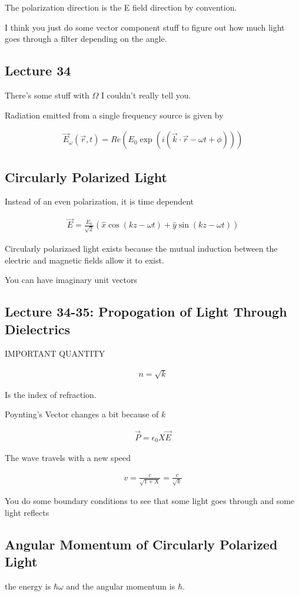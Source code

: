 \documentclass[fleqn]{report}
\newcommand{\equations} [1] {
\begin{gather*}
#1
\end{gather*}
}
\begin{document}
The polarization direction is the E field direction by convention. 

I think you just do some vector component stuff to figure out how much light 
goes through a filter depending on the angle. 

\subsection{Lecture 34}
There's some stuff with $\Omega$ I couldn't really tell you. 

Radiation emitted from a single frequency source is given by 

\equations{
    \vec E_{\omega}(\vec r, t)
    =
    Re 
    \left(
        E_0
        \exp(i (\vec k \cdot \vec r - \omega t + \phi ))
    \right)
}

\subsection{Circularly Polarized Light}
Instead of an even polarization, it is time dependent 
\equations{
    \vec E 
    =
    \frac{E_0}{\sqrt{2}}
    \left(
        \hat x 
        \cos(kz - \omega t)
        +
        \hat y
        \sin(kz - \omega t)
    \right)
}

Circularly polarizaed light exists because the mutual induction between 
the electric and magnetic fields allow it to exist. 

You can have imaginary unit vectors 

\subsection{Lecture 34-35: Propogation of Light Through Dielectrics}

IMPORTANT QUANTITY
\equations{
    n = \sqrt{k}
}
Is the index of refraction.

Poynting's Vector changes a bit because of $k$

\equations{
    \vec P = \epsilon_0 X \vec E 
}

The wave travels with a new speed 
\equations{
    v = \frac{c}{\sqrt{1 + X}} = \frac{c}{\sqrt{k}} 
}

You do some boundary conditions to see that some light goes through 
and some light reflects 


\subsection{Angular Momentum of Circularly Polarized Light}
the energy is $\hbar \omega$ and the angular momentum is $\hbar$. 
\end{document}
